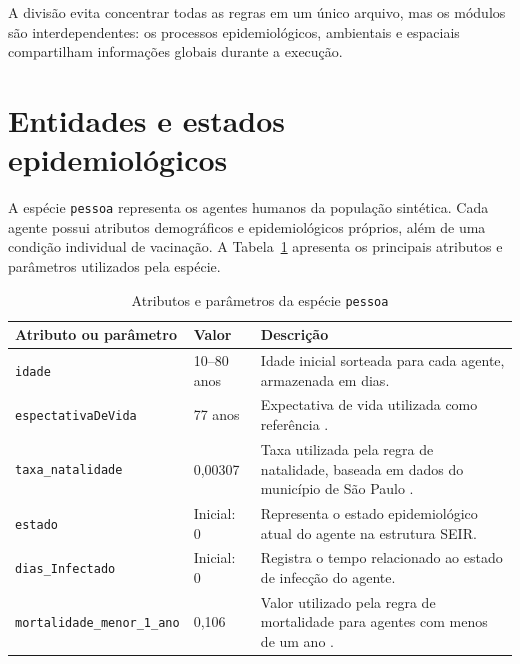 A divisão evita concentrar todas as regras em um único arquivo, mas os módulos são interdependentes: os processos epidemiológicos, ambientais e espaciais compartilham informações globais durante a execução.

\section{Entidades e estados epidemiológicos}
\label{sec:parametros}
A espécie \texttt{pessoa} representa os agentes humanos da população sintética. Cada agente possui atributos demográficos e epidemiológicos próprios, além de uma condição individual de vacinação. A Tabela~\ref{tab:parametros-pessoa} apresenta os principais atributos e parâmetros utilizados pela espécie.

\begin{table}[htb]
    \centering
    \caption{Atributos e parâmetros da espécie \texttt{pessoa}}
    \label{tab:parametros-pessoa}
    \begin{tabular}{p{4.0cm} p{2.5cm} p{5.9cm}}
        \hline
        \textbf{Atributo ou parâmetro} & \textbf{Valor} & \textbf{Descrição} \\
        \hline

        \texttt{idade}
        & 10--80 anos
        & Idade inicial sorteada para cada agente, armazenada em dias. \\

        \texttt{espectativaDeVida}
        & 77 anos
        & Expectativa de vida utilizada como referência \cite{usp_expectativa_vida_2024}. \\

        \texttt{taxa\_natalidade}
        & 0,00307
        & Taxa utilizada pela regra de natalidade, baseada em dados do município de São Paulo \cite{prefeitura_sp_taxa_natalidade}. \\

        \texttt{estado}
        & Inicial: 0
        & Representa o estado epidemiológico atual do agente na estrutura SEIR. \\

        \texttt{dias\_Infectado}
        & Inicial: 0
        & Registra o tempo relacionado ao estado de infecção do agente. \\

        \texttt{mortalidade\_menor\_1\_ano}
        & 0,106
        & Valor utilizado pela regra de mortalidade para agentes com menos de um ano \cite{souza_letalidade_dengue_2025}. \\


\end{tabular}
\end{table}
